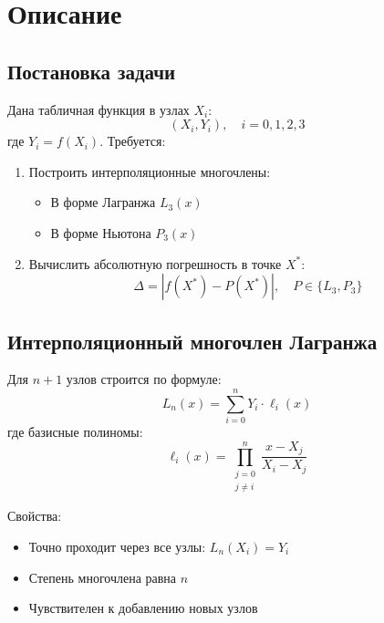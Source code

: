 

\section*{Описание}

\subsection*{Постановка задачи}
Дана табличная функция в узлах $X_i$:
\[ (X_i, Y_i), \quad i=0,1,2,3 \]
где $Y_i = f(X_i)$. Требуется:
\begin{enumerate}
\item Построить интерполяционные многочлены:
\begin{itemize}
\item В форме Лагранжа $L_3(x)$
\item В форме Ньютона $P_3(x)$
\end{itemize}
\item Вычислить абсолютную погрешность в точке $X^*$:
\[ \Delta = |f(X^*) - P(X^*)|, \quad P \in \{L_3, P_3\} \]
\end{enumerate}

\subsection*{Интерполяционный многочлен Лагранжа}
Для $n+1$ узлов строится по формуле:
\[ L_n(x) = \sum_{i=0}^n Y_i \cdot \ell_i(x) \]
где базисные полиномы:
\[ \ell_i(x) = \prod_{\substack{j=0 \\ j\neq i}}^n \frac{x-X_j}{X_i-X_j} \]

Свойства:
\begin{itemize}
\item Точно проходит через все узлы: $L_n(X_i) = Y_i$
\item Степень многочлена равна $n$
\item Чувствителен к добавлению новых узлов
\end{itemize}

